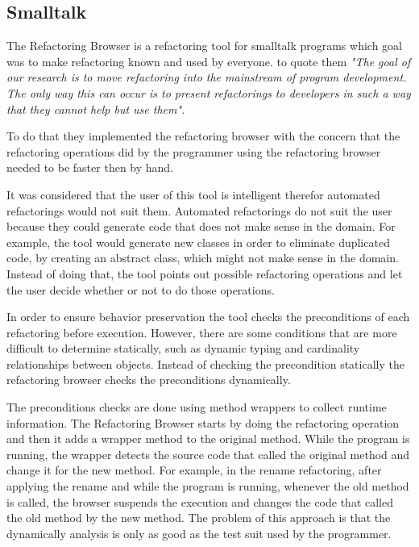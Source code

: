 





\subsection{Smalltalk}%

The Refactoring Browser \cite{roberts1997refactoring} is a refactoring tool for smalltalk programs which goal was to make refactoring known and used by everyone.
to quote them  \textit{"The goal of our research is to move refactoring into the mainstream of program development. The only way this can occur is to present refactorings to developers in such a way that they cannot help but use them".} 

To do that they implemented the refactoring browser with the concern that the refactoring operations did by the programmer using the refactoring browser needed to be faster then by hand.

It was considered that the user of this tool is intelligent therefor automated refactorings would not suit them. 
Automated refactorings do not suit the user because they could generate code that does not make sense in the domain.
For example, the tool would generate new classes in order to eliminate duplicated code, by creating an abstract class, which might not make sense in the domain. Instead of doing that, the tool points out possible refactoring operations and let the user decide whether or not to do those operations.

In order to ensure behavior preservation the tool checks the preconditions of each refactoring before execution. 
However, there are some conditions that are more difficult to determine statically, such as dynamic typing and cardinality relationships between objects. 
Instead of checking the precondition statically the refactoring browser checks the preconditions dynamically. 

The preconditions checks are done using method wrappers to collect runtime information. 
The Refactoring Browser starts by doing the refactoring operation and then it adds a wrapper method to the original method. 
While the program is running, the wrapper detects the source code that called the original method and change it for the new method.
For example, in the rename refactoring, after applying the rename and while the program is running, whenever the old method is called, the browser suspends the execution and changes the code that called the old method by the new method. 
The problem of this approach is that the dynamically analysis is only as good as the test suit used by the programmer.


